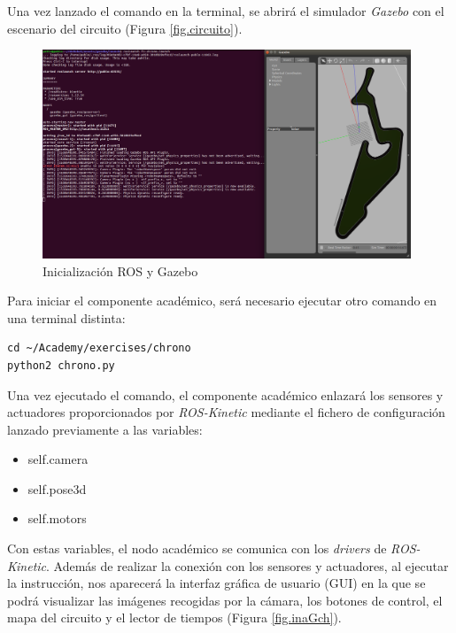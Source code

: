 Una vez lanzado el comando en la terminal, se abrirá el simulador \textit{Gazebo} con el escenario del circuito (Figura \ref{fig.circuito}).

\begin{figure}[H]
  \begin{center}
    \includegraphics[width=0.98\textwidth]{figures/roslaunch_chrono.png}
		\caption{Inicialización ROS y Gazebo}
		\label{fig.roslaunchch}
		\end{center}
\end{figure}

Para iniciar el componente académico, será necesario ejecutar otro comando en una terminal distinta:

\lstset{language=bash, breaklines=true, basicstyle=\footnotesize}
\begin{lstlisting}[frame=single]
cd ~/Academy/exercises/chrono
python2 chrono.py
\end{lstlisting}

Una vez ejecutado el comando, el componente académico enlazará los sensores y actuadores proporcionados por \textit{ROS-Kinetic} mediante el fichero de configuración lanzado previamente a las variables:

\begin{itemize}
    \item self.camera
    \item self.pose3d
    \item self.motors
\end{itemize}

Con estas variables, el nodo académico se comunica con los \textit{drivers} de \textit{ROS-Kinetic}.
Además de realizar la conexión con los sensores y actuadores, al ejecutar la instrucción, nos aparecerá la interfaz gráfica de usuario (GUI) en la que se podrá visualizar las imágenes recogidas por la cámara, los botones de control, el mapa del circuito y el lector de tiempos (Figura \ref{fig.inaGch}).

